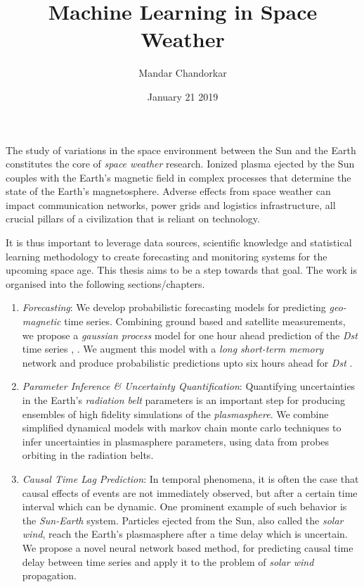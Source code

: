 \documentclass[10pt]{article}
\title{Machine Learning in Space Weather}
\author{Mandar Chandorkar}
\date{January 21 2019}
\begin{document}
\maketitle

The study of variations in the space environment between the Sun and the Earth constitutes the core of \textit{space weather} research. Ionized plasma ejected by the Sun couples with the Earth’s magnetic field in complex processes that determine the state of the Earth's magnetosphere. Adverse effects from space weather can impact communication networks, power grids and logistics infrastructure, all crucial pillars of a civilization that is reliant on technology.

It is thus important to leverage data sources, scientific knowledge and statistical learning methodology to create forecasting and monitoring systems for the upcoming space age. This thesis aims to be a step towards that goal. The work is organised into the following sections/chapters.

\begin{enumerate}
\item \textit{Forecasting}: We develop probabilistic forecasting models for predicting \textit{geo-magnetic} time series. Combining ground based and satellite measurements, we propose a \textit{gaussian process} model for one hour ahead prediction of the \textit{Dst} time series \cite{ChandorkarDst}, \cite{CHANDORKAR2018237}. We augment this model with a \textit{long short-term memory} network and produce probabilistic predictions upto six hours ahead for \textit{Dst} \cite{doi:10.1029/2018SW001898}.

\item \textit{Parameter Inference \& Uncertainty Quantification}: Quantifying uncertainties in the Earth's \textit{radiation belt} parameters is an important step for producing ensembles of high fidelity simulations of the \textit{plasmasphere}. We combine simplified dynamical models with markov chain monte carlo techniques to infer uncertainties in plasmasphere parameters, using data from probes orbiting in the radiation belts.

\item \textit{Causal Time Lag Prediction}: In temporal phenomena, it is often the case that causal effects of events are not immediately observed, but after a certain time interval which can be dynamic. One prominent example of such behavior is the \textit{Sun-Earth} system. Particles ejected from the Sun, also called the \textit{solar wind}, reach the Earth's plasmasphere after a time delay which is uncertain. We propose a novel neural network based method, for predicting causal time delay between time series and apply it to the problem of \textit{solar wind} propagation.



\end{enumerate}






\end{document}
